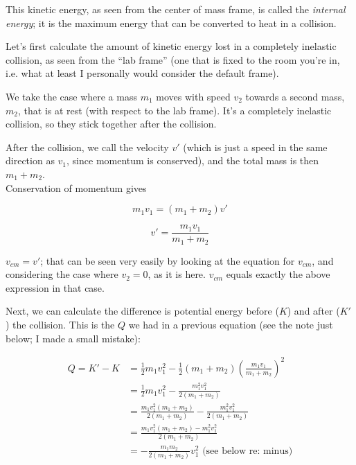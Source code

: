\documentclass[12pt,a4paper]{report}
\begin{document}
This kinetic energy, as seen from the center of mass frame, is called the \emph{internal energy}; it is the maximum energy that can be converted to heat in a collision.

Let's first calculate the amount of kinetic energy lost in a completely inelastic collision, as seen from the ``lab frame'' (one that is fixed to the room you're in, i.e. what at least I personally would consider the default frame).

We take the case where a mass $m_1$ moves with speed $v_2$ towards a second mass, $m_2$, that is at rest (with respect to the lab frame). It's a completely inelastic collision, so they stick together after the collision.

After the collision, we call the velocity $v'$ (which is just a speed in the same direction as $v_1$, since momentum is conserved), and the total mass is then $m_1 + m_2$.\\
Conservation of momentum gives

\begin{equation}
m_1 v_1 = (m_1 + m_2) v'
\end{equation}

\begin{equation}
v' = \frac{m_1 v_1}{m_1 + m_2}
\end{equation}

$v_{cm} = v'$; that can be seen very easily by looking at the equation for $v_{cm}$, and considering the case where $v_2 = 0$, as it is here. $v_{cm}$ equals exactly the above expression in that case.

Next, we can calculate the difference is potential energy before ($K$) and after ($K'$) the collision. This is the $Q$ we had in a previous equation (see the note just below; I made a small mistake):

\begin{align}
Q = K' - K &= \frac{1}{2} m_1 v_1^2 - \frac{1}{2} (m_1 + m_2) \left(\frac{m_1 v_1}{m_1 + m_2}\right)^2\\
           &= \frac{1}{2} m_1 v_1^2 - \frac{m_1^2 v_1^2}{2(m_1 + m_2)}\\
           &= \frac{m_1 v_1^2(m_1 + m_2)}{2(m_1 + m_2)} - \frac{m_1^2 v_1^2}{2(m_1 + m_2)}\\
           &= \frac{m_1 v_1^2(m_1 + m_2) - m_1^2 v_1^2}{2(m_1 + m_2)}\\
           &= - \frac{m_1 m_2}{2(m_1 + m_2)} v_1^2 \text{ (see below re: minus)}
\end{align}
\end{document}
